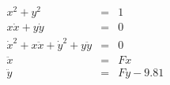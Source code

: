 \documentclass[preview]{standalone}
\begin{document}
$
\begin{array}{lcr}      
      x^2 + y^2 &=& 1\\
      x\dot{x} + y\dot{y} & = & 0\\
      \dot{x}^2 + x\ddot{x} + \dot{y}^2 + y \ddot{y} & = & 0 \\
      \ddot{x} &=& F x \\
      \ddot{y} &=& F y - 9.81
\end{array}
$
\end{document}
